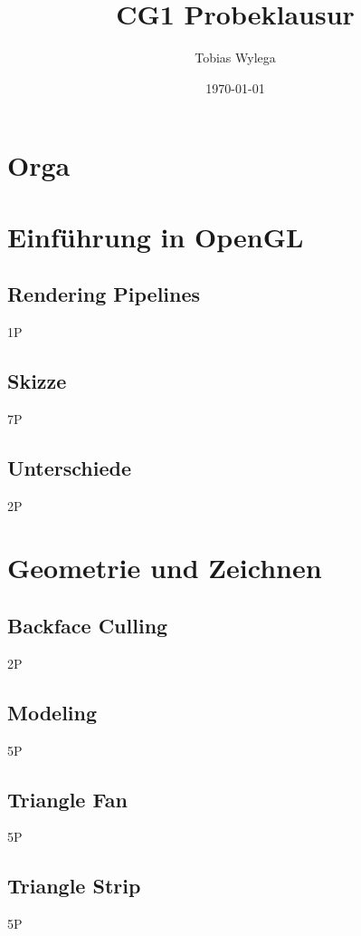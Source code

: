 \documentclass{article}
\title{CG1 Probeklausur}
\author{Tobias Wylega}
\date{\today}
\def\points#1{\begin{flushright}#1\end{flushright}}
\begin{document}
\maketitle

\tableofcontents
\newpage

\section{Orga}
 

\section{Einführung in OpenGL}
\subsection{Rendering Pipelines}
 \points{1P}

\subsection{Skizze}
 \points{7P}

\subsection{Unterschiede}
 \points{2P}


\section{Geometrie und Zeichnen}
\subsection{Backface Culling}
 \points{2P}
\subsection{Modeling}
 \points{5P}
\subsection{Triangle Fan}
 \points{5P}
\subsection{Triangle Strip}
 \points{5P}
\end{document}
